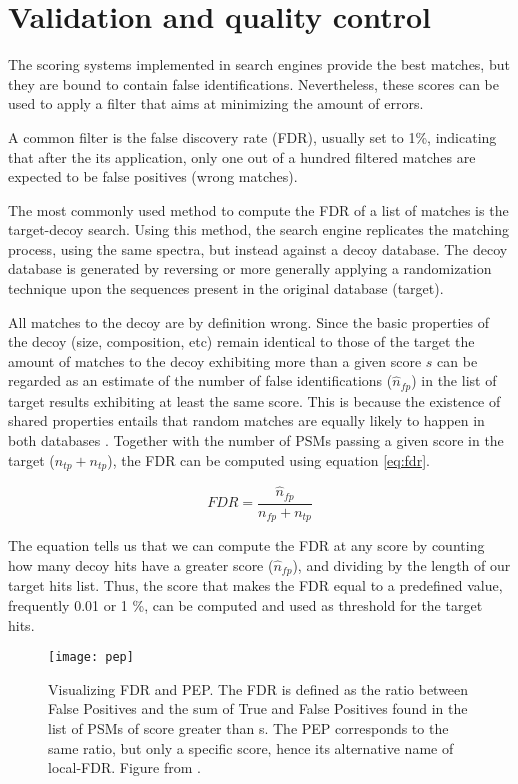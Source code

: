\section{Validation and quality control}
\label{sec:validation}

The scoring systems implemented in search engines provide the best matches, but they are bound to contain false identifications. Nevertheless, these scores can be used to apply a filter that aims at minimizing the amount of errors.

A common filter is the false discovery rate (FDR), usually set to 1\%, indicating that after the its application, only one out of a hundred filtered matches are expected to be false positives (wrong matches).

The most commonly used method to compute the \ac{FDR} of a list of matches is the target-decoy search. Using this method, the search engine replicates the matching process, using the same spectra, but instead against a decoy database. The decoy database is generated by reversing or more generally applying a randomization technique upon the sequences present in the original database (target). 

All matches to the decoy are by definition wrong. Since the basic properties of the decoy (size, composition, etc) remain identical to those of the target the amount of matches to the decoy exhibiting more than a given score $s$ can be regarded as an estimate of the number of false identifications ($\hat{n}_{fp}$) in the list of target results exhibiting at least the same score. This is because the existence of shared properties entails that random matches are equally likely to happen in both databases \cite{Elias2010}. Together with the number of PSMs passing a given score in the target ($n_{tp} + n_{tp}$), the FDR can be computed using equation \ref{eq:fdr}.

\begin{equation}\label{eq:fdr}
FDR = \frac{\hat{n}_{fp}}{n_{fp} + n_{tp}}
\end{equation}

The equation tells us that we can compute the FDR at any score by counting how many decoy hits have a greater score ($\hat{n}_{fp}$), and dividing by the length of our target hits list. Thus, the score that makes the FDR equal to a predefined value, frequently 0.01 or 1 \%, can be computed and used as threshold for the target hits.

\begin{figure}[!h]
\centering
\texttt{[image: pep]}
\caption{Visualizing FDR and PEP. The FDR is defined as the ratio between False Positives and the sum of True and False Positives found in the list of PSMs of score greater than s. The PEP corresponds to the same ratio, but only a specific score, hence its alternative name of local-FDR. Figure from \cite{Kall2008}.}
\label{fig:pep}
\end{figure}


